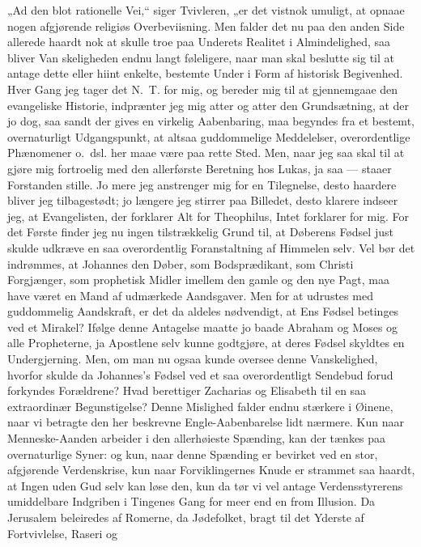 \documentclass[12pt,a4paper]{book}
\begin{document}
„Ad den blot rationelle Vei,“ siger Tvivleren, „er det vistnok
umuligt, at opnaae nogen afgjørende religiøs Overbeviisning. Men
falder det nu paa den anden Side allerede haardt nok at skulle
troe paa Underets Realitet i Almindelighed, saa bliver Van\-%
skeligheden endnu langt føleligere, naar man skal beslutte sig til
at antage dette eller hiint enkelte, bestemte Under i Form af
historisk Begivenhed. Hver Gang jeg tager det N.\ T. for mig, og
bereder mig til at gjennemgaae den evangeliske Historie,
indprænter jeg mig atter og atter den Grundsætning, at der jo dog,
saa sandt der gives en virkelig Aabenbaring, maa begyndes fra et
bestemt, overnaturligt Udgangspunkt, at altsaa guddommelige
Meddelelser, overordentlige Phænomener o.\ dsl. her maae være paa
rette Sted. Men, naar jeg saa skal til at gjøre mig fortroelig
med den allerførste Beretning hos Lukas, ja saa --- staaer
Forstanden stille. Jo mere jeg anstrenger mig for en Tilegnelse,
desto haardere bliver jeg tilbagestødt; jo længere jeg stirrer paa
Billedet, desto klarere indseer jeg, at Evangelisten, der forklarer
Alt for Theophilus, Intet forklarer for mig. For det Første
finder jeg nu ingen tilstrækkelig Grund til, at Døberens Fødsel
just skulde udkræve en saa overordentlig Foranstaltning af
Himmelen selv. Vel bør det indrømmes, at Johannes den Døber, som
Bodsprædikant, som Christi Forgjænger, som prophetisk Midler
imellem den gamle og den nye Pagt, maa have været en Mand af
udmærkede Aandsgaver. Men for at udrustes med guddommelig
Aandskraft, er det da aldeles nødvendigt, at Ens Fødsel betinges
ved et Mirakel? Ifølge denne Antagelse maatte jo baade Abraham og
Moses og alle Propheterne, ja Apostlene selv kunne godtgjøre, at
deres Fødsel skyldtes en Undergjerning. Men, om man nu ogsaa
kunde oversee denne Vanskelighed, hvorfor skulde da Johannes's
Fødsel ved et saa overordentligt Sendebud forud forkyndes
Forældrene? Hvad berettiger Zacharias og Elisabeth til en saa
extraordinær Begunstigelse? Denne Mislighed falder endnu stærkere
i Øinene, naar vi betragte den her beskrevne Engle-Aabenbarelse
lidt nærmere. Kun naar Menneske-Aanden arbeider i den allerhøieste
Spænding, kan der tænkes paa overnaturlige Syner: og kun, naar
denne Spænding er bevirket ved en stor, afgjørende Verdenskrise,
kun naar Forviklingernes Knude er strammet saa haardt, at Ingen
uden Gud selv kan løse den, kun da tør vi vel antage
Verdensstyrerens umiddelbare Indgriben i Tingenes Gang for meer
end en from Illusion. Da Jerusalem beleiredes af Romerne, da
Jødefolket, bragt til det Yderste af Fortvivlelse, Raseri og
\end{document}
